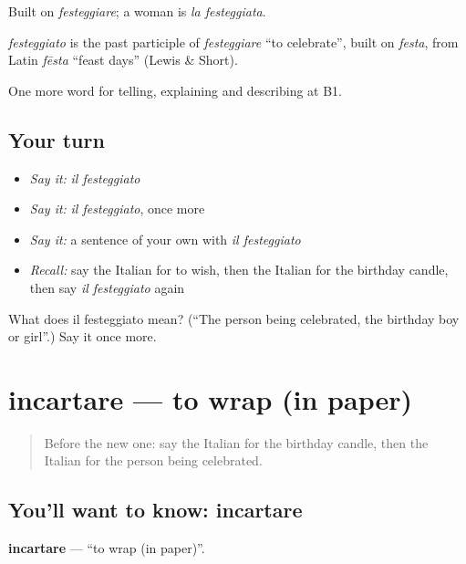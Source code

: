 Built on \emph{festeggiare}; a woman is \emph{la festeggiata}.

\begin{cousinweb}
\emph{festeggiato} is the past participle of \emph{festeggiare} \textquotedblleft{}to celebrate\textquotedblright{}, built on \emph{festa}, from Latin \emph{fēsta} \textquotedblleft{}feast days\textquotedblright{} (Lewis \& Short).
\end{cousinweb}

\begin{grammarlens}[title={What you've built}]
One more word for telling, explaining and describing at B1.
\end{grammarlens}

\subsection*{Your turn}
\begin{itemize}
\raggedright
  \item \emph{Say it:} \emph{il festeggiato}
  \item \emph{Say it:} \emph{il festeggiato}, once more
  \item \emph{Say it:} a sentence of your own with \emph{il festeggiato}
  \item \emph{Recall:} say the Italian for to wish, then the Italian for the birthday candle, then say \emph{il festeggiato} again
\end{itemize}

\begin{tcolorbox}[breakable,colback=teal!4,colframe=teal!35!black,title={Before you move on}]
What does il festeggiato mean? (\textquotedblleft{}The person being celebrated, the birthday boy or girl\textquotedblright{}.) Say it once more.
\end{tcolorbox}
\section[incartare]{incartare — to wrap (in paper)}

\label{lesson:IT-C316-incartare}



\begin{quote}
Before the new one: say the Italian for the birthday candle, then the Italian for the person being celebrated.
\end{quote}

\subsection*{You'll want to know: incartare}
\textbf{incartare} — \textquotedblleft{}to wrap (in paper)\textquotedblright{}.

